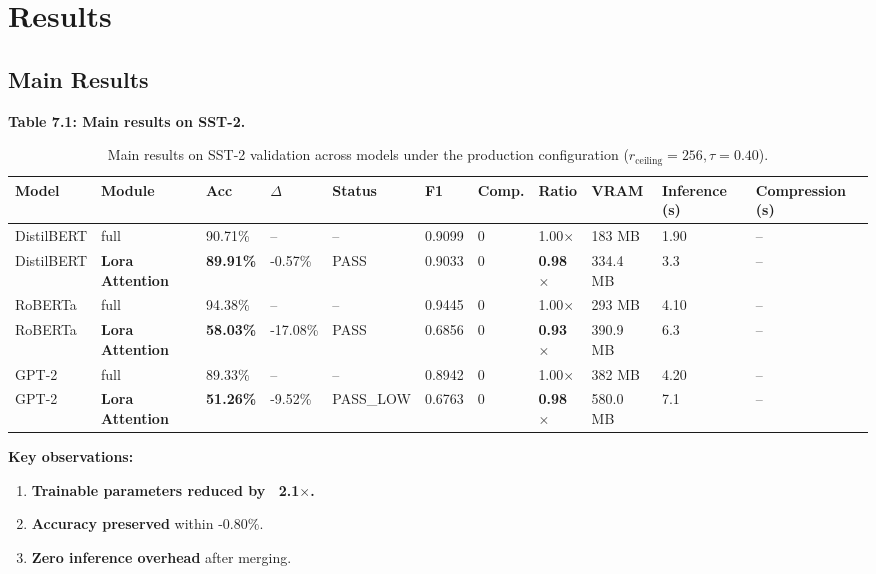 \section{Results}

\subsection{Main Results}

\textbf{Table 7.1: Main results on SST-2.}

\begin{table}[t]
\centering
\small
\begin{tabular}{lllllllllll}
\toprule
\textbf{Model} & \textbf{Module} & \textbf{Acc} & \textbf{$\Delta$} & \textbf{Status} & \textbf{F1} & \textbf{Comp.} & \textbf{Ratio} & \textbf{VRAM} & \textbf{Inference (s)} & \textbf{Compression (s)} \\
\midrule
DistilBERT & full & 90.71\% & -- & -- & 0.9099 & 0 & 1.00$\times$ & 183 MB & 1.90 & -- \\
DistilBERT & \textbf{Lora Attention} & \textbf{89.91\%} & -0.57\% & PASS & 0.9033 & 0 & \textbf{0.98$\times$} & 334.4 MB & 3.3 & -- \\
RoBERTa & full & 94.38\% & -- & -- & 0.9445 & 0 & 1.00$\times$ & 293 MB & 4.10 & -- \\
RoBERTa & \textbf{Lora Attention} & \textbf{58.03\%} & -17.08\% & PASS & 0.6856 & 0 & \textbf{0.93$\times$} & 390.9 MB & 6.3 & -- \\
GPT-2 & full & 89.33\% & -- & -- & 0.8942 & 0 & 1.00$\times$ & 382 MB & 4.20 & -- \\
GPT-2 & \textbf{Lora Attention} & \textbf{51.26\%} & -9.52\% & PASS\_LOW & 0.6763 & 0 & \textbf{0.98$\times$} & 580.0 MB & 7.1 & -- \\
\bottomrule
\end{tabular}
\caption{Main results on SST-2 validation across models under the production configuration ($r_{\mathrm{ceiling}}=256, \tau=0.40$).}
\label{tab:main_sst2}
\end{table}

\textbf{Key observations:}

\begin{enumerate}
\item \textbf{Trainable parameters reduced by ~2.1$\times$.}
\item \textbf{Accuracy preserved} within -0.80\%.
\item \textbf{Zero inference overhead} after merging.

\end{enumerate}

